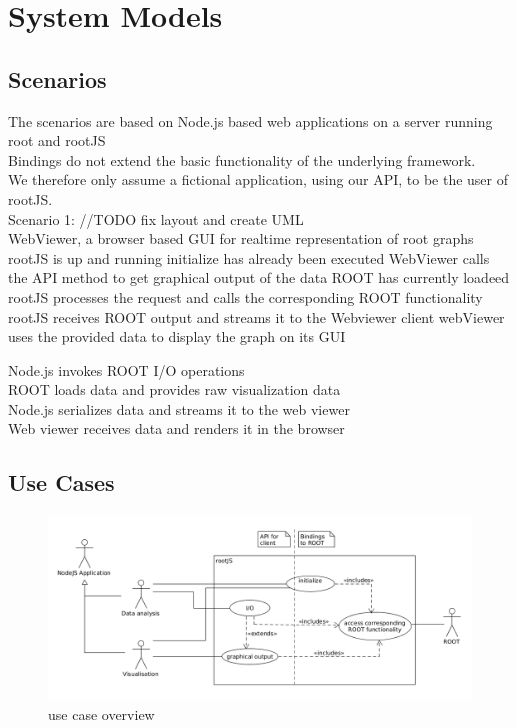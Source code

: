 \chapter{System Models}

\section{Scenarios}
The scenarios are based on Node.js based web applications on a server running root and rootJS\\
Bindings do not extend the basic functionality of the underlying framework.\\
We therefore only assume a fictional application, using our API, to be the user of rootJS.\\


Scenario 1: //TODO fix layout and create UML\\
WebViewer, a browser based GUI for realtime representation of root graphs
	rootJS is up and running initialize has already been executed
	WebViewer calls the API method to get graphical output of the data ROOT has currently loadeed
	\indent rootJS processes the request and calls the corresponding ROOT functionality
	\indent rootJS receives ROOT output and streams it to the Webviewer client
webViewer uses the provided data to display the graph on its GUI

\indent	Node.js invokes ROOT I/O operations\\
\indent \indent		ROOT loads data and provides raw visualization data\\
\indent	Node.js serializes data and streams it to the web viewer\\
Web viewer receives data and renders it in the browser\\
\section{Use Cases}
\begin{figure}[htb]
	\centering
	\includegraphics[width=18cm]{./latex/resources/usecaseOverview.png}
	\caption{use case overview}
\end{figure}

